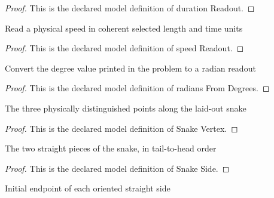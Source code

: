\begin{proof}
  This is the declared model definition of duration Readout.
\end{proof}
\begin{definition}
  \label{def:physics:phyx-mini-0680:phyxminiproblems-problemphyxmini0680-speedreadout}
  Read a physical speed in coherent selected length and time units
\end{definition}
\begin{proof}
  This is the declared model definition of speed Readout.
\end{proof}
\begin{definition}
  \label{def:physics:phyx-mini-0680:phyxminiproblems-problemphyxmini0680-radiansfromdegrees}
  Convert the degree value printed in the problem to a radian readout
\end{definition}
\begin{proof}
  This is the declared model definition of radians From Degrees.
\end{proof}
\begin{definition}
  \label{def:physics:phyx-mini-0680:phyxminiproblems-problemphyxmini0680-snakevertex}
  The three physically distinguished points along the laid-out snake
\end{definition}
\begin{proof}
  This is the declared model definition of Snake Vertex.
\end{proof}
\begin{definition}
  \label{def:physics:phyx-mini-0680:phyxminiproblems-problemphyxmini0680-snakeside}
  The two straight pieces of the snake, in tail-to-head order
\end{definition}
\begin{proof}
  This is the declared model definition of Snake Side.
\end{proof}
\begin{definition}
  \label{def:physics:phyx-mini-0680:phyxminiproblems-problemphyxmini0680-snakeside-startvertex}
  Initial endpoint of each oriented straight side
\end{definition}
